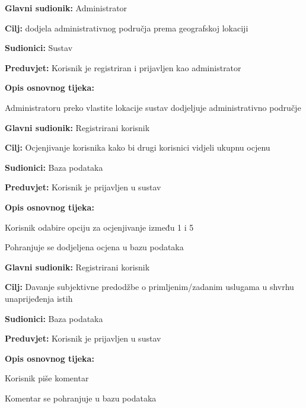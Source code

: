 \noindent {}
\begin{packed_item}
	\item \textbf{Glavni sudionik: }Administrator
	\item  \textbf{Cilj:} dodjela administrativnog područja prema geografskoj lokaciji
	\item  \textbf{Sudionici:} Sustav
	\item  \textbf{Preduvjet:} Korisnik je registriran i prijavljen kao administrator
	\item  \textbf{Opis osnovnog tijeka:}
	\item[] \begin{packed_enum}
		\item Administratoru preko vlastite lokacije sustav dodjeljuje administrativno područje
	\end{packed_enum}
\end{packed_item}
\newpage
\noindent {}
\begin{packed_item}
	\item \textbf{Glavni sudionik: } Registrirani korisnik
	\item  \textbf{Cilj:} Ocjenjivanje korisnika kako bi drugi korisnici vidjeli ukupnu ocjenu  
	\item  \textbf{Sudionici:} Baza podataka
	\item  \textbf{Preduvjet:} Korisnik je prijavljen u sustav
	\item  \textbf{Opis osnovnog tijeka:}
	\item[] \begin{packed_enum}
		\item Korisnik odabire opciju za ocjenjivanje između 1 i 5
		\item Pohranjuje se dodjeljena ocjena u bazu podataka
	\end{packed_enum}
\end{packed_item}

\noindent {}
\begin{packed_item}
	\item \textbf{Glavni sudionik: } Registrirani korisnik
	\item  \textbf{Cilj:} Davanje subjektivne predodžbe o primljenim/zadanim uslugama u shvrhu unaprijeđenja istih
	\item  \textbf{Sudionici:} Baza podataka
	\item  \textbf{Preduvjet:} Korisnik je prijavljen u sustav
	\item  \textbf{Opis osnovnog tijeka:}
	\item[] \begin{packed_enum}
		\item Korisnik piše komentar 
		\item Komentar se pohranjuje u bazu podataka
	\end{packed_enum}
\end{packed_item}

